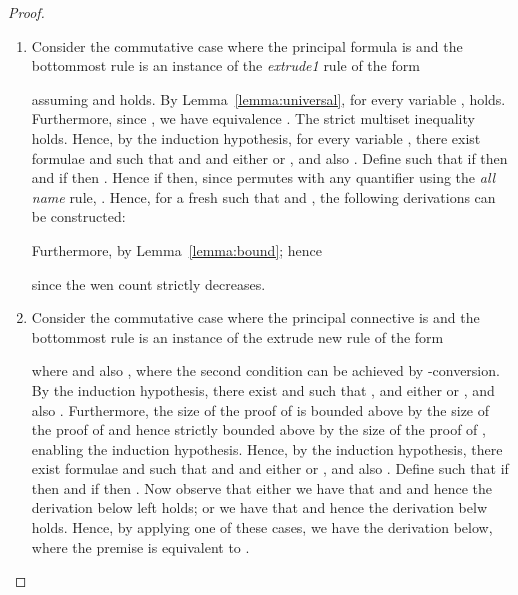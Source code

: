 \begin{proof}
\begin{enumerate}[label=\textbf{\Alph*},ref=\Alph*,leftmargin=*]
\begin{enumerate}[label*=\textbf{.\arabic*}]
where  holds.
By the induction hypothesis, we have that both  and  hold;
and furthermore the multiset inequalities 

hold.
Hence, by the induction hypothesis, there exist  and  such that ,  and either  or .
Also, by the induction hypothesis, there exist  and  such that
,  and either  or .
Furthermore the two derivations 

and
 hold.
Now define  such that if  and  then , and 
 otherwise, observing that in either case .
In the case  and , by the \textit{with name} rule,
.
In the case  and , by the \textit{left name} rule,
.
In the case that  and , by the \textit{right name} rule,
.
Thereby the following derivation and proof can be constructed:

Furthermore, by Lemma~\ref{lemma:bound}, ; and,
since the \textit{wen} count strictly decreases,
.




\item Consider the commutative case where the principal formula is  and the bottommost rule is an instance of the
\textit{extrude1} rule of the form

 assuming 
and  holds.
By Lemma~\ref{lemma:universal}, for every variable ,  holds.
Furthermore, since , we have equivalence .
The strict multiset inequality  holds.
Hence, by the induction hypothesis, for every variable , there exist formulae  and  such that  and  and either  or , and also
.
Define  such that if  then  and if  then . Hence if  then, since  permutes with any quantifier using the \textit{all name} rule, .
Hence, for a fresh  such that  and , 
the following derivations can be constructed:

Furthermore,  by Lemma~\ref{lemma:bound}; hence 
 
since the wen count strictly decreases.


\item Consider the commutative case where the principal connective is  and the bottommost rule is an instance of the extrude new rule of the form 

 where  and also , where the second condition can be achieved by -conversion.
By the induction hypothesis, there exist  and  such that ,  and either  or , and also
.
Furthermore, the size of the proof of  is bounded above by the size of the proof of  and hence strictly bounded above by the size of the proof of , enabling the induction hypothesis.
Hence, by the induction hypothesis, there exist formulae  and  such that  and  and either  or , and also .
Define  such that if  then  and if  then .
Now observe that either we have that  and  and hence
the derivation  below left holds;  or we have that  and hence the derivation  belw  holds. 
Hence,
by applying one of these cases, we have the derivation  below, where the premise is equivalent to .


\end{enumerate}
\end{enumerate}
\end{proof}
